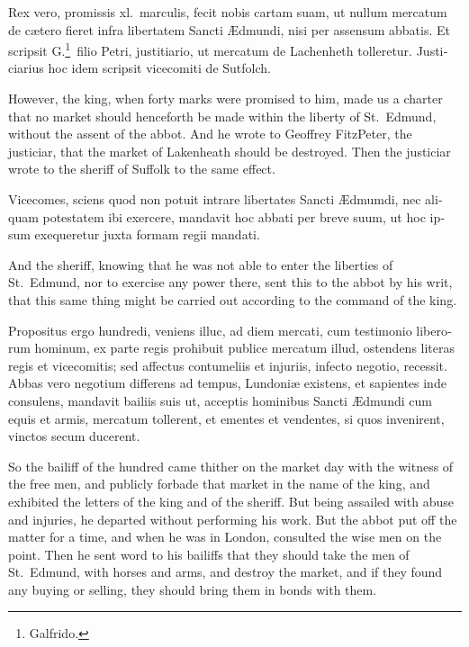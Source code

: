 \documentclass[10pt]{book}
\begin{document}
\begin{paracol}{2}
\switchcolumn*

\begin{otherlanguage}{latin}
Rex vero, promissis xl.\ marculis, fecit nobis cartam suam, ut nullum mercatum de c\ae{}tero fieret infra libertatem Sancti \AE{}dmundi, nisi per assensum abbatis. Et scripsit G.\footnote[\textdagger]{Galfrido.}\ filio Petri, justitiario, ut mercatum de Lachenheth tolleretur. Justiciarius hoc idem scripsit vicecomiti de Sutfolch.
\end{otherlanguage}

\switchcolumn

However, the king, when forty marks were promised to him, made us a charter that no market should henceforth be made within the liberty of St.\ Edmund, without the assent of the abbot. And he wrote to Geoffrey FitzPeter, the justiciar, that the market of Lakenheath should be destroyed. Then the justiciar wrote to the sheriff of Suffolk to the same effect.

\switchcolumn*

\begin{otherlanguage}{latin}
Vicecomes, sciens quod non potuit intrare libertates Sancti \AE{}dmumdi, nec aliquam potestatem ibi exercere, mandavit hoc abbati per breve suum, ut hoc ipsum exequeretur juxta formam regii mandati.
\end{otherlanguage}

\switchcolumn

And the sheriff, knowing that he was not able to enter the liberties of St.\ Edmund, nor to exercise any power there, sent this to the abbot by his writ, that this same thing might be carried out according to the command of the king.

\switchcolumn*

\begin{otherlanguage}{latin}
Propositus ergo hundredi, veniens illuc, ad diem mercati, cum testimonio liberorum hominum, ex parte regis prohibuit publice mercatum illud, ostendens literas regis et vicecomitis; sed affectus contumeliis et injuriis, infecto negotio, recessit. Abbas vero negotium differens ad tempus, Lundoni\ae{} existens, et sapientes inde consulens, mandavit bailiis suis ut, acceptis hominibus Sancti \AE{}dmundi cum equis et armis, mercatum tollerent, et ementes et vendentes, si quos invenirent, vinctos secum ducerent.
\end{otherlanguage}

\switchcolumn

So the bailiff of the hundred came thither on the market day with the witness of the free men, and publicly forbade that market in the name of the king, and exhibited the letters of the king and of the sheriff. But being assailed with abuse and injuries, he departed without performing his work. But the abbot put off the matter for a time, and when he was in London, consulted the wise men on the point. Then he sent word to his bailiffs that they should take the men of St.\ Edmund, with horses and arms, and destroy the market, and if they found any buying or selling, they should bring them in bonds with them.


\end{paracol}
\end{document}
